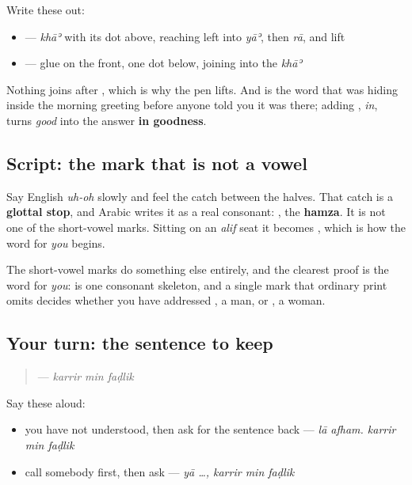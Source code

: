 Write these out:

\begin{itemize}
\raggedright
  \item \textbf{} — \emph{khāʾ} with its dot above, reaching left into \emph{yāʾ}, then \emph{rā}, and lift
  \item \textbf{} — glue \textbf{} on the front, one dot below, joining into the \emph{khāʾ}
\end{itemize}

Nothing joins after \textbf{}, which is why the pen lifts. And \textbf{} is the word that was hiding inside the morning greeting before anyone told you it was there; adding \textbf{}, \emph{in}, turns \emph{good} into the answer \textbf{in goodness}.

\subsection*{Script: the mark that is not a vowel}
Say English \emph{uh-oh} slowly and feel the catch between the halves. That catch is a \textbf{glottal stop}, and Arabic writes it as a real consonant: \textbf{}, the \textbf{hamza}. It is not one of the short-vowel marks. Sitting on an \emph{alif} seat it becomes \textbf{}, which is how the word for \emph{you} begins.

The short-vowel marks do something else entirely, and the clearest proof is the word for \emph{you}: \textbf{} is one consonant skeleton, and a single mark that ordinary print omits decides whether you have addressed \textbf{}, a man, or \textbf{}, a woman.

\subsection*{Your turn: the sentence to keep}
\begin{quote}
\textbf{  } — \emph{karrir min faḍlik}
\end{quote}

Say these aloud:

\begin{itemize}
\raggedright
  \item you have not understood, then ask for the sentence back — \emph{lā afham. karrir min faḍlik}
  \item call somebody first, then ask — \emph{yā …, karrir min faḍlik}
\end{itemize}

